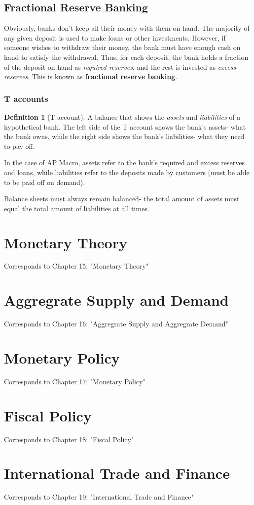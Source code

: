 \documentclass[12pt, a4paper]{article}
\theoremstyle{definition}
\newtheorem{definition}{Definition}
\begin{document}
\subsection{Fractional Reserve Banking}
Obviously, banks don't keep all their money with them on hand.
The majority of any given deposit is used to make loans or other investments.
However, if someone wishes to withdraw their money, the bank must have enough cash on hand to satisfy the withdrawal.
Thus, for each deposit, the bank holds a fraction of the deposit on hand as \textit{required reserves}, and the rest is invested as \textit{excess reserves}.
This is known as \textbf{fractional reserve banking}.

\subsubsection{T accounts}
\begin{definition}[T account]
    A balance that shows the \textit{assets} and \textit{liabilities} of a hypothetical bank.
    The left side of the T account shows the bank's assets- what the bank owns, while the right side shows the bank's liabilities- what they need to pay off.
\end{definition}

In the case of AP Macro, assets refer to the bank's required and excess reserves and loans, while liabilities refer to the deposits made by customers (must be able to be paid off on demand).

Balance sheets must always remain balanced- the total amount of assets must equal the total amount of liabilities at all times.


\newpage

\section{Monetary Theory}
Corresponds to Chapter 15: "Monetary Theory"

\newpage

\section{Aggregrate Supply and Demand}
Corresponds to Chapter 16: "Aggregrate Supply and Aggregrate Demand"

\newpage

\section{Monetary Policy}
Corresponds to Chapter 17: "Monetary Policy"

\newpage

\section{Fiscal Policy}
Corresponds to Chapter 18: "Fiscal Policy"

\newpage

\section{International Trade and Finance}
Corresponds to Chapter 19: "International Trade and Finance"

\newpage
\end{document}
